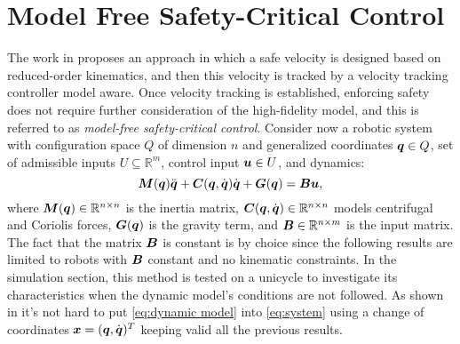 \section{Model Free Safety-Critical Control}
The work in \cite{mfcbf} proposes an approach in which a safe velocity is designed based on reduced-order kinematics, and then this velocity is tracked by a velocity tracking controller model aware.
Once velocity tracking is established, enforcing safety does not require further consideration of the high-fidelity model, and this is referred to as \textit{model-free safety-critical control}.
Consider now a robotic system with configuration space $Q$
of dimension $n$ and 
generalized coordinates ${\boldsymbol{q}} \in Q$, set of admissible inputs $U\subseteq \mathbb{R}^m$, control input $\boldsymbol{u} \in U$, and dynamics:
\begin{equation} \label{eq:dynamic model}
    \boldsymbol{M}({\boldsymbol{q}})\ddot{{\boldsymbol{q}}}+\boldsymbol{C}({\boldsymbol{q}},\dot{{\boldsymbol{q}}})\dot{{\boldsymbol{q}}}+\boldsymbol{G}({\boldsymbol{q}})=\boldsymbol{B}\boldsymbol{u},
\end{equation}
where $\boldsymbol{M}({\boldsymbol{q}})\in\mathbb{R}^{n \times n}$ is the inertia matrix, $\boldsymbol{C}({\boldsymbol{q}},\dot{{\boldsymbol{q}}})\in\mathbb{R}^{n \times n}$ models centrifugal and Coriolis forces, $\boldsymbol{G}({\boldsymbol{q}})$ is the gravity term, and $\boldsymbol{B}\in\mathbb{R}^{n \times m}$ is the input matrix. The fact that the matrix $\boldsymbol{B}$ is constant is by choice since the following results are limited to robots with $\boldsymbol{B}$ constant and no kinematic constraints. In the simulation section, this method is tested on a unicycle to investigate its characteristics when the dynamic model's conditions are not followed. As shown in \cite{robbook} it's not hard to put \eqref{eq:dynamic model} into \eqref{eq:system} using a change of coordinates $\boldsymbol{x} = ({\boldsymbol{q}}, \dot{\boldsymbol{q}})^T$ keeping valid all the previous results.
